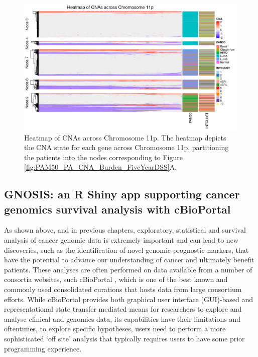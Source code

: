 \vfill 

\begin{figure}[H]
  \centering
  \includegraphics[width=1\textwidth]{../figures/Chapter_3/PA_PartyKit_Survival_Burden_FiveYearDSS_PAM50.png_11p_All_Heatmap.png}
  \caption[Heatmap of CNAs across Chromosome 11p]{Heatmap of CNAs across Chromosome 11p. The heatmap depicts the CNA state for each gene across Chromosome 11p, partitioning the patients into the nodes corresponding to Figure \ref{fig:PAM50_PA_CNA_Burden_FiveYearDSS}A.}
  \label{PA_SurvTrees_Burden_Heatmaps_11p}
\end{figure}

\subsection{GNOSIS: an R Shiny app supporting cancer genomics survival analysis with cBioPortal}
As shown above, and in previous chapters, exploratory, statistical and survival analysis of cancer genomic data is extremely important and can lead to new discoveries, such as the identification of novel genomic prognostic markers, that have the potential to advance our understanding of cancer and ultimately benefit patients. These analyses are often performed on data available from a number of consortia websites, such cBioPortal \citep{pmid22588877, pmid23550210}, which is one of the best known and commonly used consolidated curations that hosts data from large consortium efforts. While cBioPortal provides both graphical user interface (GUI)-based and representational state transfer mediated means for researchers to explore and analyse clinical and genomics data, its capabilities have their limitations and oftentimes, to explore specific hypotheses, users need to perform a more sophisticated ‘off site’ analysis that typically requires users to have some prior programming experience. 

